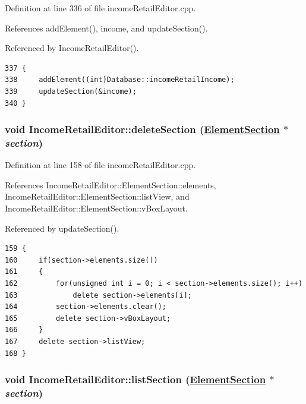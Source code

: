 Definition at line 336 of file income\-Retail\-Editor.cpp.

References add\-Element(), income, and update\-Section().

Referenced by Income\-Retail\-Editor().

\footnotesize\begin{verbatim}337 {
338     addElement((int)Database::incomeRetailIncome);
339     updateSection(&income);
340 }
\end{verbatim}\normalsize 


\hypertarget{classIncomeRetailEditor_d1}{
\subsubsection[deleteSection]{\setlength{\rightskip}{0pt plus 5cm}void Income\-Retail\-Editor::delete\-Section (\hyperlink{structIncomeRetailEditor_1_1ElementSection}{Element\-Section} $\ast$ {\em section})}}
\label{classIncomeRetailEditor_d1}


Definition at line 158 of file income\-Retail\-Editor.cpp.

References Income\-Retail\-Editor::Element\-Section::elements, Income\-Retail\-Editor::Element\-Section::list\-View, and Income\-Retail\-Editor::Element\-Section::v\-Box\-Layout.

Referenced by update\-Section().

\footnotesize\begin{verbatim}159 {
160     if(section->elements.size())
161     {
162         for(unsigned int i = 0; i < section->elements.size(); i++)
163             delete section->elements[i];
164         section->elements.clear();
165         delete section->vBoxLayout;
166     }
167     delete section->listView;
168 }
\end{verbatim}\normalsize 


\hypertarget{classIncomeRetailEditor_d0}{
\subsubsection[listSection]{\setlength{\rightskip}{0pt plus 5cm}void Income\-Retail\-Editor::list\-Section (\hyperlink{structIncomeRetailEditor_1_1ElementSection}{Element\-Section} $\ast$ {\em section})}}
\label{classIncomeRetailEditor_d0}


